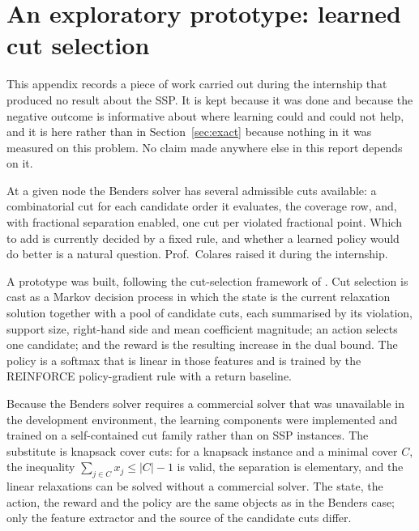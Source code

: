 \section{An exploratory prototype: learned cut selection}\label{app:rl}\label{ssec:rl}

This appendix records a piece of work carried out during the internship that produced
no result about the SSP. It is kept because it was done and because the negative
outcome is informative about where learning could and could not help, and it is here
rather than in Section~\ref{sec:exact} because nothing in it was measured on this
problem. No claim made anywhere else in this report depends on it.

At a given node the Benders solver has several admissible cuts available: a
combinatorial cut for each candidate order it evaluates, the coverage row, and, with
fractional separation enabled, one cut per violated fractional point. Which to add is
currently decided by a fixed rule, and whether a learned policy would do better is a
natural question. Prof.~Colares raised it during the internship.

A prototype was built, following the cut-selection framework of \citet{Tang2020}. Cut
selection is cast as a Markov decision process in which the state is the current
relaxation solution together with a pool of candidate cuts, each summarised by its
violation, support size, right-hand side and mean coefficient magnitude; an action
selects one candidate; and the reward is the resulting increase in the dual bound. The
policy is a softmax that is linear in those features and is trained by the REINFORCE
policy-gradient rule with a return baseline.

Because the Benders solver requires a commercial solver that was unavailable in the
development environment, the learning components were implemented and trained on a
self-contained cut family rather than on SSP instances. The substitute is knapsack
cover cuts: for a knapsack instance and a minimal cover $C$, the inequality
$\sum_{j\in C}x_j\le\lvert C\rvert-1$ is valid, the separation is elementary, and the
linear relaxations can be solved without a commercial solver. The state, the action,
the reward and the policy are the same objects as in the Benders case; only the feature
extractor and the source of the candidate cuts differ.

